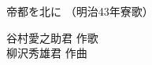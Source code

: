 \documentclass[10pt,b5j]{tarticle} %
\begin{document}
\begin{minipage}[c]{0.7\hsize} %
    \begin{center}
        {\LARGE
            帝都を北に %
        }
        {\small 
            （明治43年寮歌） %
        }
    \end{center}
\end{minipage}
\begin{minipage}[c]{0.3\hsize} %
    \begin{flushright} %
        谷村愛之助君 作歌\\柳沢秀雄君 作曲 %
    \end{flushright}
\end{minipage}
\end{document}
